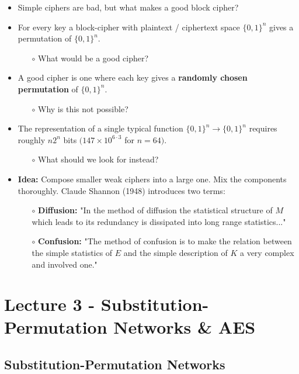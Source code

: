 \documentclass[a4paper]{scrartcl}
\begin{document}
\begin{itemize}
\item Simple ciphers are bad, but what makes a good block cipher?
\item For every key a block-cipher with plaintext / ciphertext space $\{0, 1\}^n$ gives a permutation of $\{0, 1\}^n$.
\begin{itemize}
\item [$\circ$] What would be a good cipher?
\end{itemize}
\item A good cipher is one where each key gives a \textbf{randomly chosen permutation} of $\{0, 1\}^n$.
\begin{itemize}
\item [$\circ$] Why is this not possible?
\end{itemize}
\item The representation of a single typical function $\{0, 1\}^n \rightarrow \{0, 1\}^n$ requires roughly $n2^n$ bits $(147 \times 10^{6 \cdot 3}$ for $n = 64)$.
\begin{itemize}
\item [$\circ$] What should we look for instead?
\end{itemize}
\item \textbf{Idea:} Compose smaller weak ciphers into a large one. Mix the components thoroughly. Claude Shannon (1948) introduces two terms:
\begin{itemize}
\item [$\circ$] \textbf{Diffusion:} "In the method of diffusion the statistical structure of $M$ which leads to its redundancy is dissipated into long range statistics..."
\item [$\circ$] \textbf{Confusion:} "The method of confusion is to make the relation between the simple statistics of $E$ and the simple description of $K$ a very complex and involved one."
\end{itemize}
\end{itemize}

\section*{Lecture 3 - Substitution-Permutation Networks \& AES}

\subsection*{Substitution-Permutation Networks}
\end{document}
